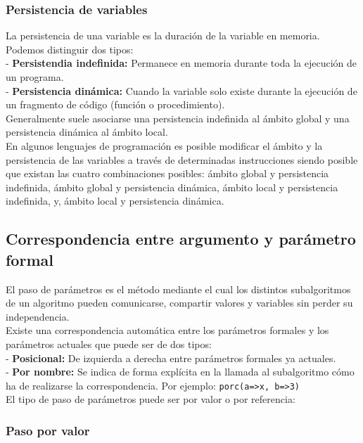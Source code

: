 \documentclass[12pt,letterpaper]{article}
\begin{document}
\subsubsection{Persistencia de variables}

La persistencia de una variable es la duración de la variable en memoria. Podemos distinguir dos tipos:\\
- \textbf{Persistendia indefinida:} Permanece en memoria durante toda la ejecución de un programa.\\
- \textbf{Persistencia dinámica:} Cuando la variable solo existe durante la ejecución de un fragmento de código (función o procedimiento).\\
Generalmente suele asociarse una persistencia indefinida al ámbito global y una persistencia dinámica al ámbito local.\\
En algunos lenguajes de programación es posible modificar el ámbito y la persistencia de las variables a través de determinadas instrucciones siendo posible que existan las cuatro combinaciones posibles: ámbito global y persistencia indefinida, ámbito global y persistencia dinámica, ámbito local y persistencia indefinida, y, ámbito local y persistencia dinámica.\\

\subsection{Correspondencia entre argumento y parámetro formal}

El paso de parámetros es el método mediante el cual los distintos subalgoritmos de un algoritmo pueden comunicarse, compartir valores y variables sin perder su independencia.\\
Existe una correspondencia automática entre los parámetros formales y los parámetros actuales que puede ser de dos tipos:\\
- \textbf{Posicional:} De izquierda a derecha entre parámetros formales ya actuales.\\
- \textbf{Por nombre:} Se indica de forma explícita en la llamada al subalgoritmo cómo ha de realizarse la correspondencia. Por ejemplo: \texttt{porc(a=>x, b=>3)}\\
El tipo de paso de parámetros puede ser por valor o por referencia:

\subsubsection{Paso por valor}
\end{document}
